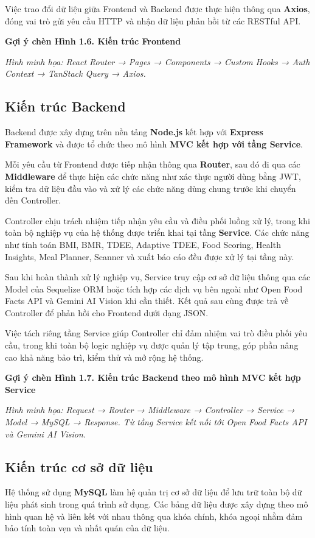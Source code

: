 \documentclass[12pt, a4paper]{report}
\begin{document}
Việc trao đổi dữ liệu giữa Frontend và Backend được thực hiện thông qua \textbf{Axios}, đóng vai trò gửi yêu cầu HTTP và nhận dữ liệu phản hồi từ các RESTful API.

\textbf{Gợi ý chèn Hình 1.6. Kiến trúc Frontend}

\textit{Hình minh họa: React Router → Pages → Components → Custom Hooks → Auth Context → TanStack Query → Axios.}

\subsection{Kiến trúc Backend}Backend được xây dựng trên nền tảng \textbf{Node.js} kết hợp với \textbf{Express Framework} và được tổ chức theo mô hình \textbf{MVC kết hợp với tầng Service}.

Mỗi yêu cầu từ Frontend được tiếp nhận thông qua \textbf{Router}, sau đó đi qua các \textbf{Middleware} để thực hiện các chức năng như xác thực người dùng bằng JWT, kiểm tra dữ liệu đầu vào và xử lý các chức năng dùng chung trước khi chuyển đến Controller.

Controller chịu trách nhiệm tiếp nhận yêu cầu và điều phối luồng xử lý, trong khi toàn bộ nghiệp vụ của hệ thống được triển khai tại tầng \textbf{Service}. Các chức năng như tính toán BMI, BMR, TDEE, Adaptive TDEE, Food Scoring, Health Insights, Meal Planner, Scanner và xuất báo cáo đều được xử lý tại tầng này.

Sau khi hoàn thành xử lý nghiệp vụ, Service truy cập cơ sở dữ liệu thông qua các Model của Sequelize ORM hoặc tích hợp các dịch vụ bên ngoài như Open Food Facts API và Gemini AI Vision khi cần thiết. Kết quả sau cùng được trả về Controller để phản hồi cho Frontend dưới dạng JSON.

Việc tách riêng tầng Service giúp Controller chỉ đảm nhiệm vai trò điều phối yêu cầu, trong khi toàn bộ logic nghiệp vụ được quản lý tập trung, góp phần nâng cao khả năng bảo trì, kiểm thử và mở rộng hệ thống.

\textbf{Gợi ý chèn Hình 1.7. Kiến trúc Backend theo mô hình MVC kết hợp Service}

\textit{Hình minh họa: Request → Router → Middleware → Controller → Service → Model → MySQL → Response. Từ tầng Service kết nối tới Open Food Facts API và Gemini AI Vision.}

\subsection{Kiến trúc cơ sở dữ liệu}Hệ thống sử dụng \textbf{MySQL} làm hệ quản trị cơ sở dữ liệu để lưu trữ toàn bộ dữ liệu phát sinh trong quá trình sử dụng. Các bảng dữ liệu được xây dựng theo mô hình quan hệ và liên kết với nhau thông qua khóa chính, khóa ngoại nhằm đảm bảo tính toàn vẹn và nhất quán của dữ liệu.
\end{document}
